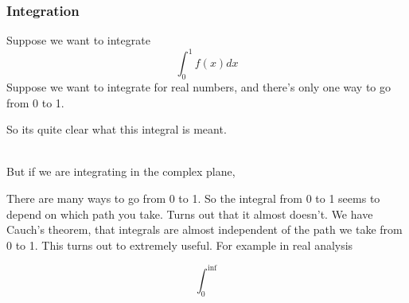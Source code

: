 \documentclass{article}
\begin{document}
\subsubsection{Integration}
Suppose we want to integrate
\begin{displaymath}
	\int_{0}^{1}f(x)dx
\end{displaymath}
Suppose we want to integrate for real numbers, and there's only one way to go from 0 to 1.
\begin{center}
\end{center}
So its quite clear what this integral is meant.

\noindent \\ But if we are integrating in the complex plane,
\begin{center}
\end{center}
There are many ways to go from 0 to 1. So the integral from 0 to 1 seems to depend on which path you take.
Turns out that it almost doesn't. We have Cauch's theorem, that integrals are almost independent of the path
we take from 0 to 1. This turns out to extremely useful. For example in real analysis

\begin{displaymath}
	\int_{0}^{\inf}
\end{displaymath}
\end{document}
